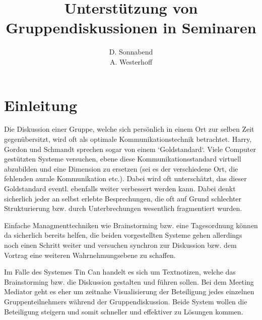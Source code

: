\documentclass{seminarvorlage}
\begin{document}
\title{Unterstützung von Gruppendiskussionen in Seminaren}
\author{
  \alignauthor D. Sonnabend\\
  \alignauthor A. Westerhoff\\
}

\maketitle




\section{Einleitung}
Die Diskussion einer Gruppe, welche sich persönlich in einem Ort zur selben Zeit
gegenübersitzt, wird oft als optimale Kommunikationstechnik betrachtet. Harry,
Gordon und Schmandt sprechen sogar von einem `Goldstandard`. Viele Computer
gestützten Systeme versuchen, ebene diese Kommunikationsstandard virtuell
abzubilden und eine Dimension zu ersetzen (sei es der verschiedene Ort, die
fehlenden aurale Kommunikation etc.). Dabei wird oft unterschätzt, das dieser
Goldstandard eventl. ebenfalls weiter verbessert werden kann. Dabei denkt
sicherlich jeder an selbst erlebte Besprechungen, die oft auf Grund schlechter
Strukturierung bzw.
durch Unterbrechungen wesentlich fragmentiert wurden.

Einfache Managmenttechniken wie Brainstorming bzw. eine Tagesordnung können da
sicherlich bereits helfen, die beiden vorgestellten Systeme gehen allerdings
noch einen Schritt weiter und versuchen synchron zur Diskussion bzw. dem Vortrag
eine weiteren Wahrnehmungsebene zu schaffen.

Im Falle des Systemes Tin Can
handelt es sich um Textnotizen, welche das Brainstorming bzw. die Diskussion
gestalten und führen sollen. Bei dem Meeting Mediator geht es eher um zeitnahe
Visualisierung der Beteiligung jedes einzelnen Gruppenteilnehmers während der
Gruppendiskussion. Beide System wollen die Beteiligung steigern und somit
schneller und effektiver zu Lösungen kommen.
\end{document}
